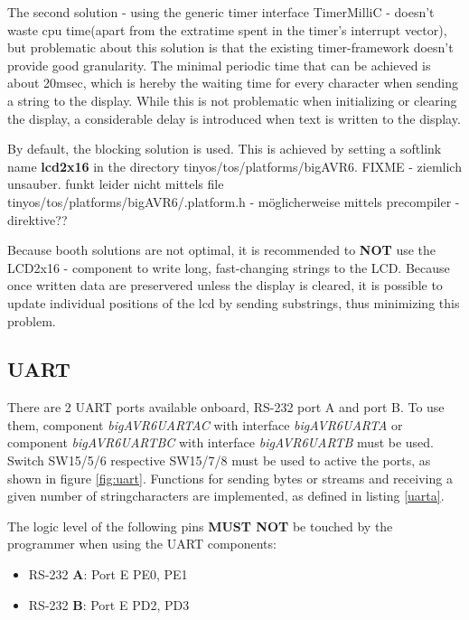 The second solution - using the generic timer interface TimerMilliC - doesn't waste cpu time(apart from the extratime spent in the timer's interrupt vector), but problematic about this solution is that the existing timer-framework doesn't provide good granularity. The minimal periodic time that can be achieved is about 20msec, which is hereby the waiting time for every character when sending a string to the display. While this is not problematic when initializing or clearing the display, a considerable delay is introduced when text is written to the display. 

By default, the blocking solution is used. This is achieved by setting a softlink name \textbf{lcd2x16} in the directory  tinyos/tos/platforms/bigAVR6. FIXME - ziemlich unsauber. funkt leider nicht mittels file tinyos/tos/platforms/bigAVR6/.platform.h -  möglicherweise mittels precompiler - direktive??

Because booth solutions are not optimal, it is recommended to \textbf{NOT} use the LCD2x16 - component to write long, fast-changing strings to the LCD. Because once written data are preservered unless the display is cleared, it is possible to update individual positions of the lcd by sending substrings, thus minimizing this problem.

\subsection{UART}

There are 2 UART ports available onboard, RS-232 port A and port B. To use them, component \textit{bigAVR6UARTAC} with interface \textit{bigAVR6UARTA} or component \textit{bigAVR6UARTBC} with interface \textit{bigAVR6UARTB} must be used. Switch SW15/5/6 respective SW15/7/8 must be used to active the ports, as shown in figure \ref{fig:uart}. Functions for sending bytes or streams and receiving a given number of stringcharacters are implemented, as defined in listing \ref{uarta}.



The logic level of the following pins \textbf{MUST NOT} be touched by the programmer when using the UART components:

\begin{itemize}
 \item RS-232 \textbf{A}: Port E PE0, PE1
 \item RS-232 \textbf{B}: Port E PD2, PD3
\end{itemize}

